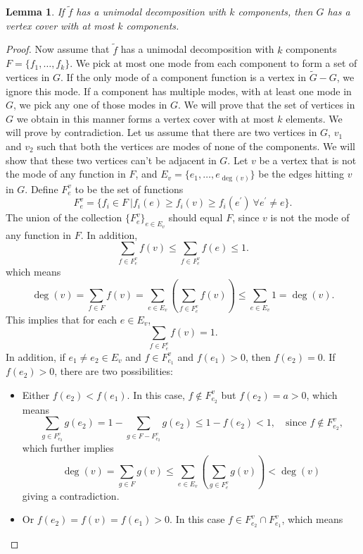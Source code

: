 \documentclass[11pt]{article}
\newtheorem{lem}[thm]{Lemma}
\begin{document}
\begin{lem}
\label{lem:umd}
    If $\tilde{f}$ has a unimodal decomposition with $k$ components, then $G$ has a vertex cover with at most $k$ components.
\end{lem}
\begin{proof}
Now assume that $\tilde{f}$ has a unimodal decomposition with $k$ components $F = \{f_1, \ldots, f_k\}$. We pick at most one mode from each component to form a set of vertices in $G$. If the only mode of a component function is a vertex in $\tilde{G} - G$, we ignore this mode. If a component has multiple modes, with at least one mode in $G$, we pick any one of those modes in $G$. We will prove that the set of vertices in $G$ we obtain in this manner forms a vertex cover with at most $k$ elements. We will prove by contradiction. Let us assume that there are two vertices in $G$, $v_1$ and $v_2$ such that both the vertices are modes of none of the components. We will show that these two vertices can't be adjacent in $G$. Let $v$ be a vertex that is not the mode of any function in $F$, and $E_v = \{e_1, \ldots, e_{\deg(v)}\}$ be the edges hitting $v$ in $G$. Define $F^{v}_{e}$ to be the set of functions
\[
	F^{v}_{e} = \{ f_i \in F \ | f_i(e)  \geq f_i(v) \geq f_i(e^{'}) \ \forall e^{'} \neq e \}.
\]
The union of the collection $\{ F^{v}_{e} \}_{e \in E_v}$ should equal $F$, since $v$ is not the mode of any function in $F$. In addition, 
\[
	\sum_{f \in F^{v}_{e}} f(v) \leq \sum_{f \in F^{v}_{e}} f(e) \leq 1.
\]
which means 
\begin{equation}
\label{impsum1}
	\deg(v) = \sum_{f \in F} f(v) = \sum_{e \in E_v} \left( \sum_{f \in F^{v}_{e}} f(v) \right) \leq \sum_{e \in E_v} 1 = \deg(v).
\end{equation}
This implies that for each $e \in E_v$,
\[
	\sum_{f \in F^{v}_{e}} f(v) = 1.
\]
In addition, if $e_1 \neq e_2 \in E_v$ and $f \in F^{v}_{e_1}$ and $f(e_1) > 0$, then $f(e_2) = 0$. If $f(e_2) > 0$, there are two possibilities:
\begin{itemize}
	\item Either $f(e_2) <  f(e_1)$. In this case, $f \notin F^{v}_{e_2}$ but $f(e_2) = a > 0$, which means
	\[
		\sum_{g \in F^{v}_{e_2}} g(e_2) = 1 - \sum_{g \in F-F^{v}_{e_2}} g(e_2) \leq 1-f(e_2) < 1, \quad \text{since $f \notin F^{v}_{e_2}$,}
	\] 
	which further implies
	\[
		\deg(v) = \sum_{g \in F} g(v) \leq \sum_{e \in E_v} \left( \sum_{g \in F^{v}_{e}} g(v) \right)  < \deg(v)
	\]
	giving a contradiction.
	\item Or $f(e_2) = f(v) = f(e_1) > 0$. In this case $f \in F^v_{e_2} \cap F^v_{e_1}$, which means

\end{itemize}
\end{proof}
\end{document}
